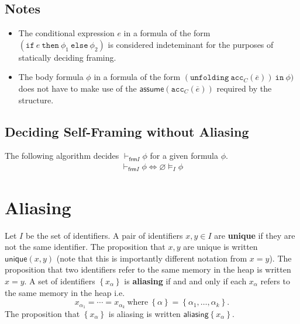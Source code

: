 \documentclass{article}
\newcommand{\tsf}{\textsf}
\newcommand{\tbf}{\textbf}
\newcommand{\ttt}{\texttt}
\newcommand{\assume}{\tsf{assume}}
\newcommand{\frames}{\vDash_I}
\newcommand{\selfframing}{\vdash_{\tsf{frm}I}}
\newcommand{\set}[1]{\left\{ #1 \right\}}
\renewcommand{\vec}{\overline}
\renewcommand{\empty}{\varnothing}
\newcommand{\cif}{\ttt{if}}
\newcommand{\cthen}{\ttt{then}}
\newcommand{\celse}{\ttt{else}}
\newcommand{\cacc}{\ttt{acc}}
\newcommand{\cunfolding}{\ttt{unfolding}}
\newcommand{\cin}{\ttt{in}}
\newcommand{\aliasing}{\tsf{aliasing}}
\newcommand{\unique}{\tsf{unique}}
\begin{document}
\subsection{Notes}

\begin{itemize}
\item The conditional expression $e$ in a formula of the form $(\cif \ e \ \cthen \ \phi_1 \ \celse \ \phi_2)$ is considered indeteminant for the purposes of statically deciding framing.

\item The body formula $\phi$ in a formula of the form $(\cunfolding \ \cacc_C(\vec{e})) \ \cin \ \phi)$ does not have to make use of the $\assume(\cacc_C(\vec{e}))$ required by the structure.
\end{itemize}

\subsection{Deciding Self-Framing without Aliasing}

\noindent
The following algorithm decides $\selfframing \phi$ for a given formula $\phi$.
\begin{align*}
\selfframing \phi \iff \empty \frames \phi
\end{align*}

\newpage
\section{Aliasing}

Let $I$ be the set of identifiers.
A pair of identifiers $x,y \in I$ are \tbf{unique} if they are not the same identifier.
The proposition that $x,y$ are unique is written $\unique(x,y)$ (note that this is importantly different notation from $x=y$).
The proposition that two identifiers refer to the same memory in the heap is written $x = y$.
A set of identifiers $\set{ x_\alpha }$ is \tbf{aliasing} if and and only if each $x_\alpha$ refers to the same memory in the heap i.e.
$$
x_{\alpha_1} = \cdots = x_{\alpha_k} \ \text{where} \ \set{\alpha} = \set{\alpha_1, \dots, \alpha_k}.
$$
The proposition that $\set{ x_\alpha }$ is aliasing is written $\aliasing \set{ x_\alpha }$.
\end{document}
